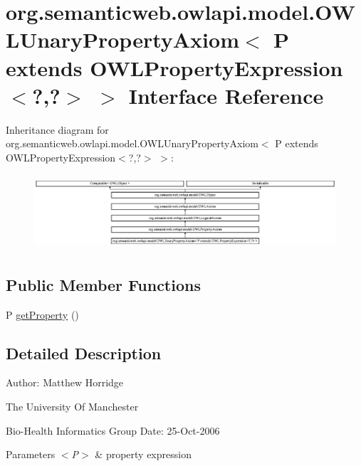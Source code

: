 \hypertarget{interfaceorg_1_1semanticweb_1_1owlapi_1_1model_1_1_o_w_l_unary_property_axiom_3_01_p_01extends_00525a6a5c0650422f5411551b03037a5}{\section{org.\-semanticweb.\-owlapi.\-model.\-O\-W\-L\-Unary\-Property\-Axiom$<$ P extends O\-W\-L\-Property\-Expression$<$?,?$>$ $>$ Interface Reference}
\label{interfaceorg_1_1semanticweb_1_1owlapi_1_1model_1_1_o_w_l_unary_property_axiom_3_01_p_01extends_00525a6a5c0650422f5411551b03037a5}
}
Inheritance diagram for org.\-semanticweb.\-owlapi.\-model.\-O\-W\-L\-Unary\-Property\-Axiom$<$ P extends O\-W\-L\-Property\-Expression$<$?,?$>$ $>$\-:\begin{figure}[H]
\begin{center}
\leavevmode
\includegraphics[height=2.814070cm]{interfaceorg_1_1semanticweb_1_1owlapi_1_1model_1_1_o_w_l_unary_property_axiom_3_01_p_01extends_00525a6a5c0650422f5411551b03037a5}
\end{center}
\end{figure}
\subsection*{Public Member Functions}
\begin{DoxyCompactItemize}
\item 
P \hyperlink{interfaceorg_1_1semanticweb_1_1owlapi_1_1model_1_1_o_w_l_unary_property_axiom_3_01_p_01extends_00525a6a5c0650422f5411551b03037a5_a833cef67b96c5584fb53c22836b2a87d}{get\-Property} ()
\end{DoxyCompactItemize}


\subsection{Detailed Description}
Author\-: Matthew Horridge\par
 The University Of Manchester\par
 Bio-\/\-Health Informatics Group Date\-: 25-\/\-Oct-\/2006 
\begin{DoxyParams}{Parameters}
{\em $<$\-P$>$} & property expression \\
\hline
\end{DoxyParams}



